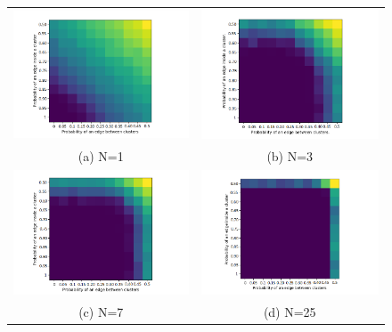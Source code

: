 \documentclass[12pt]{amsart}
\theoremstyle{remark}
\begin{document}
\begin{figure}[H]
\begin{tabular}{cc}
  \includegraphics[width=85mm]{./Pictures/Variapq1.PNG} &   \includegraphics[width=85mm]{./Pictures/Variapq3.PNG} \\
(a) N=1 & (b) N=3 \\[6pt]
 \includegraphics[width=85mm]{./Pictures/Variapq7.PNG} &   \includegraphics[width=85mm]{./Pictures/Variapq25.PNG} \\
(c) N=7 & (d) N=25\\[6pt]


\end{tabular}
\end{figure}
\end{document}
